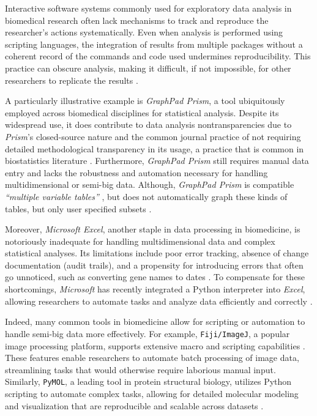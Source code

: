 %
\label{sec:intro_nontransparent_tools}%
Interactive software systems commonly used for exploratory data analysis in
biomedical research often lack mechanisms to track and reproduce the
researcher's actions systematically. Even when analysis is performed using
scripting languages, the integration of results from multiple packages without a
coherent record of the commands and code used undermines reproducibility. This
practice can obscure analysis, making it difficult, if not impossible, for other
researchers to replicate the results \cite{leekStatisticsValuesAre2015,
    pengReproducibleResearchComputational2011,
    mesirovAccessibleReproducibleResearch2010, localioStatisticalCodeSupport2018}.

A particularly illustrative example is \textit{GraphPad Prism}, a tool
ubiquitously employed across biomedical disciplines for statistical analysis.
Despite its widespread use, it does contribute to data analysis
nontransparencies due to \textit{Prism}'s closed-source nature and the common
journal practice of not requiring detailed methodological transparency in its
usage, a practice that is common in biostatistics literature
\cite{gosselinInsufficientTransparencyStatistical2021,
localioStatisticalCodeSupport2018}. Furthermore, \textit{GraphPad Prism} still
requires manual data entry and lacks the robustness and automation necessary for
handling multidimensional or semi-big data. Although, \textit{GraphPad Prism} is
compatible \textit{``multiple variable tables''} , but does not
automatically graph these kinds of tables, but only user specified subsets
\cite{GraphPadPrism102024}.

Moreover, \textit{Microsoft Excel}, another staple in data processing in
biomedicine, is notoriously inadequate for handling multidimensional data and
complex statistical analyses. Its limitations include poor error tracking,
absence of change documentation (audit trails), and a propensity for introducing
errors that often go unnoticed, such as converting gene names to dates
\cite{ziemannGeneNameErrors2016}. To compensate for these shortcomings,
\textit{Microsoft} has recently integrated a Python interpreter into
\textit{Excel}, allowing researchers to automate tasks and analyze data
efficiently and correctly \cite{microsoftexcelAnnouncingPythonExcel2023}.

Indeed, many common tools in biomedicine allow for scripting or automation to
handle semi-big data more effectively. For example, \texttt{Fiji/ImageJ}, a
popular image processing platform, supports extensive macro and scripting
capabilities \cite{ruedenImageJ2ImageJNext2017}. These features enable researchers to automate batch processing of
image data, streamlining tasks that would otherwise require laborious manual
input. Similarly, \texttt{PyMOL}, a leading tool in protein structural biology,
utilizes Python scripting to automate complex tasks, allowing for detailed
molecular modeling and visualization that are reproducible and scalable across
datasets \cite{PyMOL2024, rigsbyUsingPyMOLApplication2016}.

